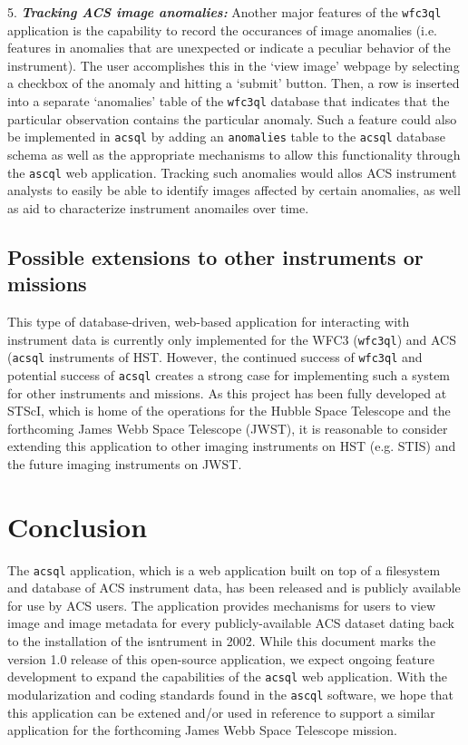 \documentclass[10pt,journal,compsoc]{IEEEtran}
\begin{document}
5. \textbf{\textit{Tracking ACS image anomalies:}}  Another major features of the \texttt{wfc3ql} application is the capability to record the occurances of image anomalies (i.e. features in anomalies that
are unexpected or indicate a peculiar behavior of the instrument).  The user accomplishes this in the `view image' webpage by selecting a checkbox of the anomaly and hitting a `submit' button.  Then,
a row is inserted into a separate `anomalies' table of the \texttt{wfc3ql} database that indicates that the particular observation contains the particular anomaly.  Such a feature could also be implemented
in \texttt{acsql} by adding an \texttt{anomalies} table to the \texttt{acsql} database schema as well as the appropriate mechanisms to allow this functionality through the \texttt{ascql} web application.
Tracking such anomalies would allos ACS instrument analysts to easily be able to identify images affected by certain anomalies, as well as aid to characterize instrument anomailes over time.


\subsection{Possible extensions to other instruments or missions} \label{sec5.2}

This type of database-driven, web-based application for interacting with instrument data is currently only implemented for the WFC3 (\texttt{wfc3ql}) and ACS (\texttt{acsql} instruments of HST.  However, the
continued success of \texttt{wfc3ql} and potential success of \texttt{acsql} creates a strong case for implementing such a system for other instruments and missions.  As this project has been fully
developed at STScI, which is home of the operations for the Hubble Space Telescope and the forthcoming James Webb Space Telescope (JWST), it is reasonable to consider extending this application to other imaging
instruments on HST (e.g. STIS) and the future imaging instruments on JWST.


\section{Conclusion} \label{chap6}
The \texttt{acsql} application, which is a web application built on top of a filesystem and database of ACS instrument data, has been released and is publicly available for use by ACS users.  The
application provides mechanisms for users to view image and image metadata for every publicly-available ACS dataset dating back to the installation of the isntrument in 2002.  While this document marks
the version 1.0 release of this open-source application, we expect ongoing feature development to expand the capabilities of the \texttt{acsql} web application.  With the modularization and
coding standards found in the \texttt{ascql} software, we hope that this application can be extened and/or used in reference to support a similar application for the forthcoming James Webb Space
Telescope mission.
\end{document}
